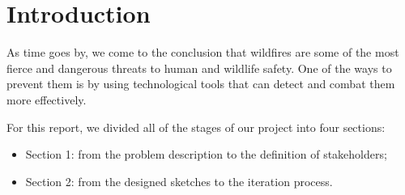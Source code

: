 \chapter{Introduction} \label{intro}
As time goes by, we come to the conclusion that wildfires are 
some of the most fierce and dangerous threats to human and 
wildlife safety. One of the ways to prevent them is by using 
technological tools that can detect and combat them more 
effectively. \par 
For this report, we divided all of the stages of our project 
into four sections: 
\begin{itemize}
    \item Section 1: from the problem description to the 
    definition of stakeholders;
    \item Section 2: from the designed sketches to the iteration 
    process.
\end{itemize}